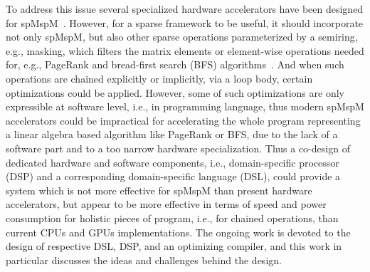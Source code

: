 \documentclass[sigplan,review,anonymous,nonacm]{acmart}\settopmatter{printfolios=true,printccs=false,printacmref=false}
\begin{document}


To address this issue several specialized hardware accelerators have been designed for spMspM~\cite{OuterSpace,zhang2020sparch}. However, for a sparse framework to be useful, it should incorporate not only spMspM, but also other sparse operations parameterized by a semiring, e.g., masking, which filters the matrix elements or element-wise operations needed for, e.g., PageRank and bread-first search (BFS) algorithms~\cite{yang2020graphblast}. And when such operations are chained explicitly or implicitly, via a loop body, certain optimizations could be applied. However, some of such optimizations are only expressible at software level, i.e., in programming language, thus modern spMspM accelerators could be impractical for accelerating the whole program representing a linear algebra based algorithm like PageRank or BFS, due to the lack of a software part and to a too narrow hardware specialization. Thus a co-design of dedicated hardware and software components, i.e., domain-specific processor (DSP) and a corresponding domain-specific language (DSL), could provide a system which is not more effective for spMspM than present hardware accelerators, but appear to be more effective in terms of speed and power consumption for holistic pieces of program, i.e., for chained operations, than current CPUs and GPUs implementations. The ongoing work is devoted to the design of respective DSL, DSP, and an optimizing compiler, and this work in particular discusses the ideas and challenges behind the design. 






    
\end{document}
